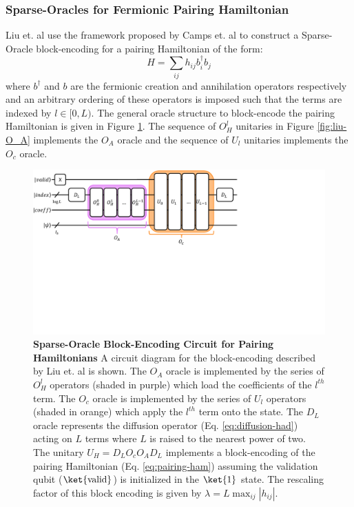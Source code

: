 
\subsubsection{Sparse-Oracles for Fermionic Pairing Hamiltonian}

Liu et. al \cite{liu2024efficient} use the framework proposed by Camps et. al \cite{camps2024explicit} to construct a Sparse-Oracle block-encoding for a pairing Hamiltonian of the form:
\begin{equation}
    \label{eq:pairing-ham}
    H = \sum_{ij}h_{ij}b^\dagger_i b_j
\end{equation}
where $b^\dagger$ and $b$ are the fermionic creation and annihilation operators respectively and an arbitrary ordering of these operators is imposed such that the terms are indexed by $l \in [0, L)$.
The general oracle structure to block-encode the pairing Hamiltonian is given in Figure \ref{fig:liu-construction}.
The sequence of $O_H^l$ unitaries in Figure \ref{fig:liu-O_A} implements the $O_A$ oracle and the sequence of $U_l$ unitaries implements the $O_c$ oracle.

\begin{figure}[h]
    \includegraphics[width=12cm]{figures/liu-construction.pdf}
    \caption{
        \textbf{Sparse-Oracle Block-Encoding Circuit for Pairing Hamiltonians}
        A circuit diagram for the block-encoding described by Liu et. al \cite{liu2024efficient} is shown.
        The $O_A$ oracle is implemented by the series of $O_H^l$ operators (shaded in purple) which load the coefficients of the $l^{th}$ term.
        The $O_c$ oracle is implemented by the series of $U_l$ operators (shaded in orange) which apply the $l^{th}$ term onto the state.
        The $D_L$ oracle represents the diffusion operator (Eq. \ref{eq:diffusion-had}) acting on $L$ terms where $L$ is raised to the nearest power of two.
        The unitary $U_H = D_L O_c O_A D_L$ implements a block-encoding of the pairing Hamiltonian (Eq. \ref{eq:pairing-ham}) assuming the validation qubit ($\ket{\text{valid}}$) is initialized in the $\ket{1}$ state.
        The rescaling factor of this block encoding is given by $\lambda = L \max_{ij} {|h_{ij}|}$.
    }
    \label{fig:liu-construction}
\end{figure}

